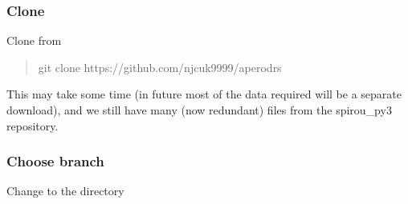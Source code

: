 \documentclass[a4paper,10pt,english]{report}
\begin{document}
\subsubsection{Clone}
\label{\detokenize{user/general/installation:clone}}
Clone from 
\begin{quote}

\begin{sphinxVerbatim}[commandchars=\\\{\}]
git clone https://github.com/njcuk9999/apero\PYGZhy{}drs
\end{sphinxVerbatim}
\end{quote}

This may take some time (in future most of the data required will be a separate download),
and we still have many (now redundant) files from the spirou\_py3 repository.


\subsubsection{Choose branch}
\label{\detokenize{user/general/installation:choose-branch}}\label{\detokenize{user/general/installation:installation-choose-branch}}
Change to the  directory
\end{document}
